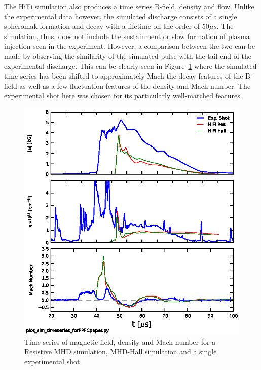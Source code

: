 \documentclass[12pt]{iopart}
\begin{document}
The HiFi simulation also produces a time series B-field, density and flow. Unlike the experimental data however, the simulated discharge consists of a single spheromak formation and decay with a lifetime on the order of $50 \mu s$. The simulation, thus, does not include the sustainment or slow formation of plasma injection seen in the experiment. However, a comparison between the two can be made by observing the similarity of the simulated pulse with the tail end of the experimental discharge. This can be clearly seen in Figure~\ref{fig:simtimeseries64} where the simulated time series has been shifted to approximately Mach the decay features of the B-field as well as a few fluctuation features of the density and Mach number. The experimental shot here was chosen for its particularly well-matched features.

\begin{figure}[!htbp]
\centerline{
\includegraphics[width=16cm]{simtimeseries64.eps}}
\caption{\label{fig:simtimeseries64} Time series of magnetic field, density and Mach number for a Resistive MHD simulation, MHD-Hall simulation and a single experimental shot.}
\end{figure}
\end{document}
